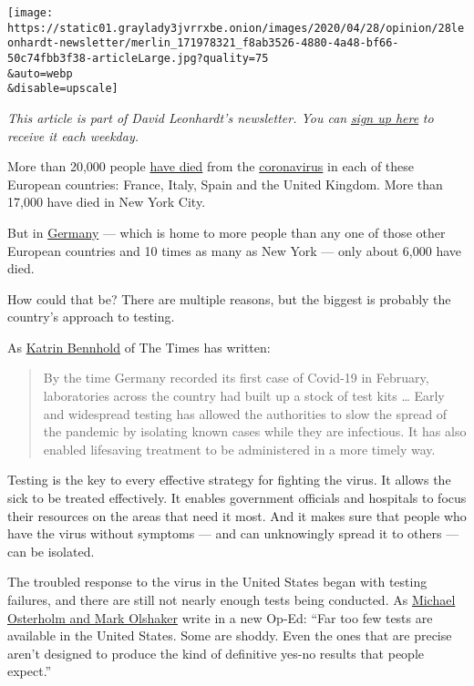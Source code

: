 \texttt{[image: https://static01.graylady3jvrrxbe.onion/images/2020/04/28/opinion/28leonhardt-newsletter/merlin\_171978321\_f8ab3526-4880-4a48-bf66-50c74fbb3f38-articleLarge.jpg?quality=75\\\&auto=webp\\\&disable=upscale]}

\emph{This article is part of David Leonhardt's newsletter. You can}
\href{https://www.nytimes3xbfgragh.onion/newsletters/opiniontoday?action=click\&module=Intentional\&pgtype=Article}{\emph{sign
up here}} \emph{to receive it each weekday.}

More than 20,000 people \href{https://coronavirus.jhu.edu/map.html}{have
died} from the
\href{https://www.nytimes3xbfgragh.onion/2020/05/06/world/europe/germany-merkel-coronavirus-reopening.html}{coronavirus}
in each of these European countries: France, Italy, Spain and the United
Kingdom. More than 17,000 have died in New York City.

But in
\href{https://www.nytimes3xbfgragh.onion/2020/05/06/world/europe/germany-merkel-coronavirus-reopening.html}{Germany}
--- which is home to more people than any one of those other European
countries and 10 times as many as New York --- only about 6,000 have
died.

How could that be? There are multiple reasons, but the biggest is
probably the country's approach to testing.

As
\href{https://www.nytimes3xbfgragh.onion/2020/04/04/world/europe/germany-coronavirus-death-rate.html}{Katrin
Bennhold} of The Times has written:

\begin{quote}
By the time Germany recorded its first case of Covid-19 in February,
laboratories across the country had built up a stock of test kits
\ldots{} Early and widespread testing has allowed the authorities to
slow the spread of the pandemic by isolating known cases while they are
infectious. It has also enabled lifesaving treatment to be administered
in a more timely way.
\end{quote}

Testing is the key to every effective strategy for fighting the virus.
It allows the sick to be treated effectively. It enables government
officials and hospitals to focus their resources on the areas that need
it most. And it makes sure that people who have the virus without
symptoms --- and can unknowingly spread it to others --- can be
isolated.

The troubled response to the virus in the United States began with
testing failures, and there are still not nearly enough tests being
conducted. As
\href{https://www.nytimes3xbfgragh.onion/2020/04/28/opinion/coronavirus-testing.html}{Michael
Osterholm and Mark Olshaker} write in a new Op-Ed: ``Far too few tests
are available in the United States. Some are shoddy. Even the ones that
are precise aren't designed to produce the kind of definitive yes-no
results that people expect.''

